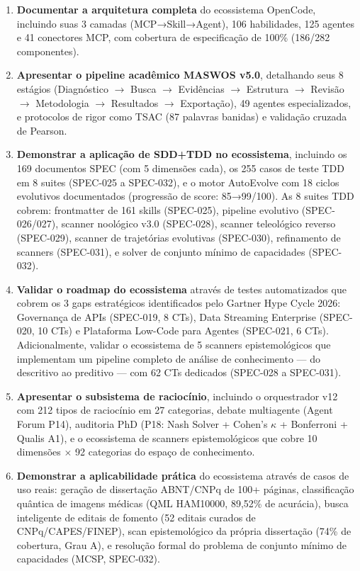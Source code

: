 \begin{enumerate}
  \item \textbf{Documentar a arquitetura completa} do ecossistema OpenCode, incluindo suas 3 camadas (MCP→Skill→Agent), 106 habilidades, 125 agentes e 41 conectores MCP, com cobertura de especificação de 100\% (186/282 componentes).

  \item \textbf{Apresentar o pipeline acadêmico MASWOS v5.0}, detalhando seus 8 estágios (Diagnóstico $\rightarrow$ Busca $\rightarrow$ Evidências $\rightarrow$ Estrutura $\rightarrow$ Revisão $\rightarrow$ Metodologia $\rightarrow$ Resultados $\rightarrow$ Exportação), 49 agentes especializados, e protocolos de rigor como TSAC (87 palavras banidas) e validação cruzada de Pearson.

  \item \textbf{Demonstrar a aplicação de SDD+TDD no ecossistema}, incluindo os 169 documentos SPEC (com 5 dimensões cada), os 255 casos de teste TDD em 8 suites (SPEC-025 a SPEC-032), e o motor AutoEvolve com 18 ciclos evolutivos documentados (progressão de score: 85→99/100). As 8 suites TDD cobrem: frontmatter de 161 skills (SPEC-025), pipeline evolutivo (SPEC-026/027), scanner noológico v3.0 (SPEC-028), scanner teleológico reverso (SPEC-029), scanner de trajetórias evolutivas (SPEC-030), refinamento de scanners (SPEC-031), e solver de conjunto mínimo de capacidades (SPEC-032).

  \item \textbf{Validar o roadmap do ecossistema} através de testes automatizados que cobrem os 3 gaps estratégicos identificados pelo Gartner Hype Cycle 2026: Governança de APIs (SPEC-019, 8 CTs), Data Streaming Enterprise (SPEC-020, 10 CTs) e Plataforma Low-Code para Agentes (SPEC-021, 6 CTs). Adicionalmente, validar o ecossistema de 5 scanners epistemológicos que implementam um pipeline completo de análise de conhecimento --- do descritivo ao preditivo --- com 62 CTs dedicados (SPEC-028 a SPEC-031).

  \item \textbf{Apresentar o subsistema de raciocínio}, incluindo o orquestrador v12 com 212 tipos de raciocínio em 27 categorias, debate multiagente (Agent Forum P14), auditoria PhD (P18: Nash Solver + Cohen's $\kappa$ + Bonferroni + Qualis A1), e o ecossistema de scanners epistemológicos que cobre 10 dimensões $\times$ 92 categorias do espaço de conhecimento.

  \item \textbf{Demonstrar a aplicabilidade prática} do ecossistema através de casos de uso reais: geração de dissertação ABNT/CNPq de 100+ páginas, classificação quântica de imagens médicas (QML HAM10000, 89,52\% de acurácia), busca inteligente de editais de fomento (52 editais curados de CNPq/CAPES/FINEP), scan epistemológico da própria dissertação (74\% de cobertura, Grau A), e resolução formal do problema de conjunto mínimo de capacidades (MCSP, SPEC-032).

\end{enumerate}

